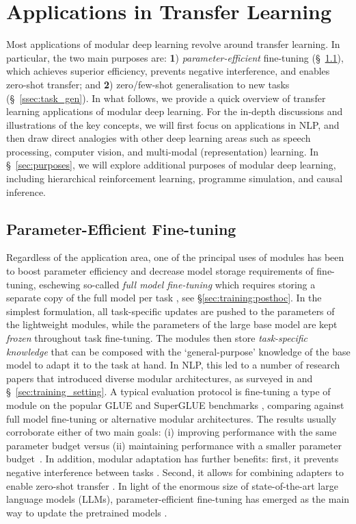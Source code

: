 \documentclass[10pt]{article} %
\begin{document}
\section{Applications in Transfer Learning}
\label{sec:applications}
Most applications of modular deep learning revolve around transfer learning. In particular, the two main purposes are: \textbf{1}) \textit{parameter-efficient} fine-tuning (\S~\ref{ssec:eff_ft}), which achieves superior efficiency, prevents negative interference, and enables zero-shot transfer; and \textbf{2}) zero/few-shot generalisation to new tasks (\S~\ref{ssec:task_gen}). In what follows, we provide a quick overview of transfer learning applications of modular deep learning. For the in-depth discussions and illustrations of the key concepts, we will first focus on applications in NLP, and then draw direct analogies with other deep learning areas such as speech processing, computer vision, and multi-modal (representation) learning.
In \S~\ref{sec:purposes}, we will explore additional purposes of modular deep learning, including hierarchical reinforcement learning, programme simulation, and causal inference.

 

\subsection{Parameter-Efficient Fine-tuning} 
\label{ssec:eff_ft}
Regardless of the application area, one of the principal uses of modules has been to boost parameter efficiency and decrease model storage requirements of fine-tuning, eschewing so-called \textit{full model fine-tuning} which requires storing a separate copy of the full model per task \citep{Howard2018ulmfit,Devlin:2019bert}, see \S\ref{sec:training:posthoc}. In the simplest formulation, all task-specific updates are pushed to the parameters of the lightweight modules, while the parameters of the large base model are kept \textit{frozen} throughout task fine-tuning. The modules then store \textit{task-specific knowledge} that can be composed with the `general-purpose' knowledge of the base model to adapt it to the task at hand. 
In NLP, this led to a number of research papers that introduced diverse modular architectures, as surveyed in  and \S~\ref{sec:training_setting}. A typical evaluation protocol is fine-tuning a type of module on the popular GLUE and SuperGLUE  benchmarks \citep{Wang:2019superglue}, comparing against full model fine-tuning or alternative modular architectures. The results usually corroborate either of two main goals: (i) improving performance with the same parameter budget versus (ii) maintaining performance with a smaller parameter budget~\citep{Mahabadi2021Compacter,han:2023autopeft}. In addition, modular adaptation has further benefits: first, it prevents negative interference between tasks \citep{Bapna2019Adapters}. Second, it allows for combining adapters to enable zero-shot transfer \citep{pfeiffer-etal-2020-mad}. In light of the enormous size of state-of-the-art large language models (LLMs), parameter-efficient fine-tuning has emerged as the main way to update the pretrained models \citep{hu2021lora}.
\end{document}

